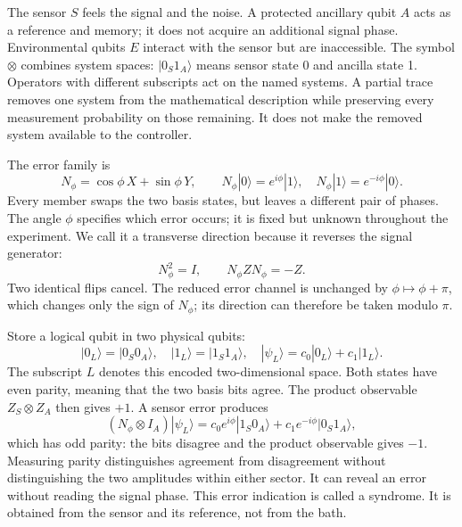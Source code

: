 \documentclass[11pt,a4paper]{article}
\numberwithin{equation}{section}
\theoremstyle{remark}
\begin{document}
The sensor $S$ feels the signal and the noise. A protected ancillary qubit
$A$ acts as a reference and memory; it does not acquire an additional signal
phase. Environmental qubits $E$ interact with the sensor but are inaccessible.
The symbol $\otimes$ combines system spaces: $|0_S1_A\rangle$ means sensor
state 0 and ancilla state 1. Operators with different subscripts act on the
named systems. A partial trace removes one system from the mathematical
description while preserving every measurement probability on those remaining.
It does not make the removed system available to the controller.

The error family is
\begin{equation}
 N_\phi=\cos\phi\,X+\sin\phi\,Y,\qquad
 N_\phi|0\rangle=e^{i\phi}|1\rangle,\quad
 N_\phi|1\rangle=e^{-i\phi}|0\rangle.
 \label{intro:error}
\end{equation}
Every member swaps the two basis states, but leaves a different pair of
phases. The angle $\phi$ specifies which error occurs; it is fixed but
unknown throughout the experiment. We call it a transverse direction
because it reverses the signal generator:
\begin{equation}
 N_\phi^2=I,\qquad N_\phi ZN_\phi=-Z.
 \label{intro:erroralgebra}
\end{equation}
Two identical flips cancel. The reduced error channel is unchanged by
$\phi\mapsto\phi+\pi$, which changes only the sign of $N_\phi$; its
direction can therefore be taken modulo $\pi$.

Store a logical qubit in two physical qubits:
\begin{equation}
 |0_L\rangle=|0_S0_A\rangle,\quad
 |1_L\rangle=|1_S1_A\rangle,\quad
 |\psi_L\rangle=c_0|0_L\rangle+c_1|1_L\rangle.
 \label{intro:code}
\end{equation}
The subscript $L$ denotes this encoded two-dimensional space. Both states
have even parity, meaning that the two basis bits agree. The product
observable $Z_S\otimes Z_A$ then gives $+1$. A sensor error produces
\begin{equation}
 (N_\phi\otimes I_A)|\psi_L\rangle
 =c_0e^{i\phi}|1_S0_A\rangle+c_1e^{-i\phi}|0_S1_A\rangle,
 \label{intro:parity}
\end{equation}
which has odd parity: the bits disagree and the product observable gives
$-1$. Measuring parity distinguishes agreement from disagreement without
distinguishing the two amplitudes within either sector. It can reveal an
error without reading the signal phase. This error indication is called a
syndrome. It is obtained from the sensor and its reference, not from the bath.
\end{document}
